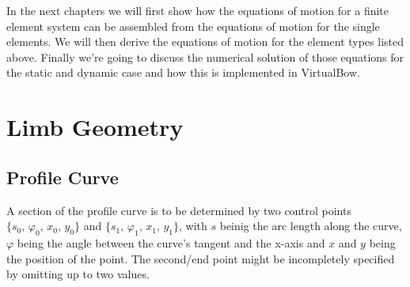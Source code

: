 In the next chapters we will first show how the equations of motion for a finite element system can be assembled from the equations of motion for the single elements. We will then derive the equations of motion for the element types listed above. Finally we're going to discuss the numerical solution of those equations for the static and dynamic case and how this is implemented in VirtualBow.

\newpage
\section{Limb Geometry}

\subsection{Profile Curve}

A section of the profile curve is to be determined by two control points $\{ s_0,\,\varphi_0,\,x_0,\,y_0 \}$ and $\{ s_1,\,\varphi_1,\,x_1,\,y_1 \}$, with $s$ beinig the arc length along the curve, $\varphi$ being the angle between the curve's tangent and the x-axis and $x$ and $y$ being the position of the point.
The second/end point might be incompletely specified by omitting up to two values.

